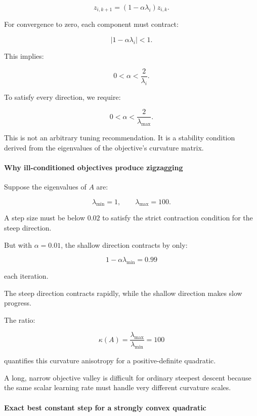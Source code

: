 \[
\boxed{ z_{i,k+1}=(1-\alpha\lambda_i)z_{i,k} }.
\]

For convergence to zero, each component must contract:

\[
|1-\alpha\lambda_i|<1.
\]

This implies:

\[
0<\alpha<\frac2{\lambda_i}.
\]

To satisfy every direction, we require:

\[
\boxed{ 0<\alpha<\frac2{\lambda_{\max}} }.
\]

This is not an arbitrary tuning recommendation. It is a stability condition derived from the eigenvalues of the objective's curvature matrix.

\paragraph{Why ill-conditioned objectives produce zigzagging}\label{02-foundations-ii-ch026-why-ill-conditioned-objectives-produce-zigzagging}

\hypertarget{02-foundations-ii-ch026-why-ill-conditioned-objectives-produce-zigzagging}{}

Suppose the eigenvalues of \(A\) are:

\[
\lambda_{\min}=1, \qquad \lambda_{\max}=100.
\]

A step size must be below \(0.02\) to satisfy the strict contraction condition for the steep direction.

But with \(\alpha=0.01\), the shallow direction contracts by only:

\[
1-\alpha\lambda_{\min}=0.99
\]

each iteration.

The steep direction contracts rapidly, while the shallow direction makes slow progress.

The ratio:

\[
\boxed{\kappa(A)=\frac{\lambda_{\max}}{\lambda_{\min}}=100}
\]

quantifies this curvature anisotropy for a positive-definite quadratic.

A long, narrow objective valley is difficult for ordinary steepest descent because the same scalar learning rate must handle very different curvature scales.

\paragraph{Exact best constant step for a strongly convex quadratic}\label{02-foundations-ii-ch026-exact-best-constant-step-for-a-strongly-convex-quadratic}


